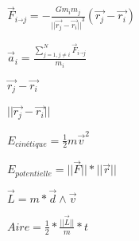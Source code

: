 \documentclass{article}
\begin{document}
$ \overrightarrow{F}_{i\overrightarrow{}j} = 
- \frac{G m_{i}m_{j}}{{||\overrightarrow{r_{j}}-\overrightarrow{r_{i}}||}^3}
{(\overrightarrow{r_{j}}-\overrightarrow{r_{i}})} $
\pagebreak

$ \overrightarrow{a}_{i} =\frac{\sum^{N}_{j=1,j \neq i}
\overrightarrow{F}_{i\overrightarrow{}{j}}}{m_{i}} $
\pagebreak

$ \overrightarrow{r_{j}}-\overrightarrow{r_{i}} $
\pagebreak

$ ||\overrightarrow{r_{j}}-\overrightarrow{r_{i}}|| $
\pagebreak

$ E_{cinétique} ={\frac{1}{2}{m}}{\overrightarrow{v}^2} $
\pagebreak

$ E_{potentielle} ={||\overrightarrow{F}||}*{||\overrightarrow{r}||} $
\pagebreak

$ {\overrightarrow{L}= m*\overrightarrow{d}}\wedge{\overrightarrow{v}} $
\pagebreak

$ Aire =\frac{1}{2}*\frac{||\overrightarrow{L}||}{m}*t $
\pagebreak
\end{document}
